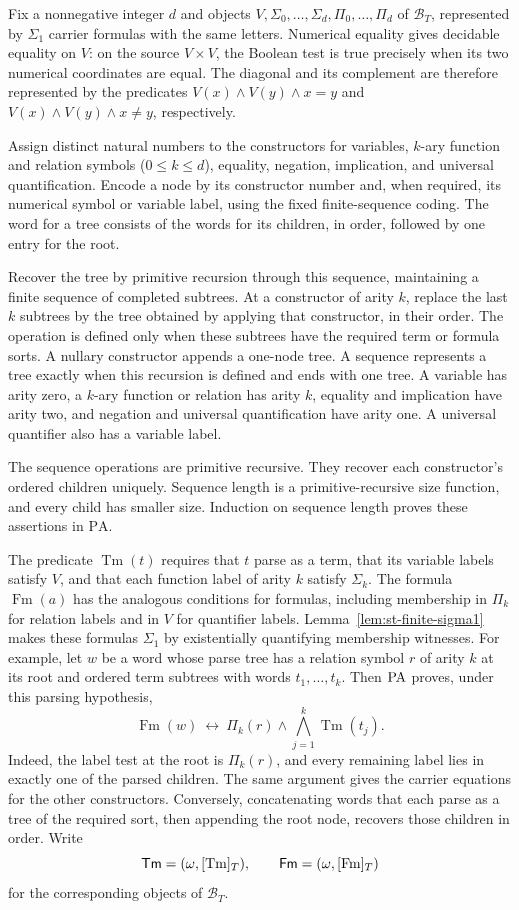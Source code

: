 Fix a nonnegative integer $d$ and objects
$V,\Sigma_0,\ldots,\Sigma_d,\Pi_0,\ldots,\Pi_d$
of $\mathcal B_T$, represented by $\Sigma_1$ carrier formulas with
the same letters. Numerical equality gives decidable equality on
$V$: on the source $V\times V$, the Boolean test is true precisely
when its two numerical coordinates are equal. The diagonal and its
complement are therefore represented by the predicates
$V(x)\land V(y)\land x=y$ and
$V(x)\land V(y)\land x\ne y$, respectively.

Assign distinct natural numbers to the constructors for variables,
$k$-ary function and relation symbols ($0\leq k\leq d$), equality,
negation, implication, and universal quantification.
Encode a node by its constructor number and, when required, its
numerical symbol or variable label, using the fixed finite-sequence
coding. The word for a tree consists of the words for its children, in order,
followed by one entry for the root.

Recover the tree by primitive recursion through this sequence,
maintaining a finite sequence of completed subtrees. At a constructor
of arity $k$, replace the last $k$ subtrees by the tree obtained by
applying that constructor, in their order. The operation is defined
only when these subtrees have the required term or formula sorts.
A nullary constructor appends a one-node tree. A sequence represents
a tree exactly when this recursion is defined and ends with one tree.
A variable has arity zero, a $k$-ary function or relation has arity $k$,
equality and implication have arity two, and negation and universal
quantification have arity one. A universal quantifier also has a
variable label.

The sequence operations are primitive recursive. They recover each
constructor's ordered children uniquely. Sequence length is a
primitive-recursive size function, and every child has smaller size.
Induction on sequence length proves these assertions in $\mathrm{PA}$.

The predicate $\operatorname{Tm}(t)$ requires that $t$ parse as a term,
that its variable labels satisfy $V$, and that each function label of
arity $k$ satisfy $\Sigma_k$. The formula
$\operatorname{Fm}(a)$ has the analogous conditions for formulas,
including membership in $\Pi_k$ for relation labels and in $V$ for
quantifier labels. Lemma~\ref{lem:st-finite-sigma1} makes these
formulas $\Sigma_1$ by existentially quantifying membership witnesses.
For example, let $w$ be a word whose parse tree has a relation
symbol $r$ of arity $k$ at its root and ordered term subtrees
with words $t_1,\ldots,t_k$. Then $\mathrm{PA}$ proves, under this
parsing hypothesis,
\[
  \operatorname{Fm}(w)\ \longleftrightarrow\
  \Pi_k(r)\land\bigwedge_{j=1}^k\operatorname{Tm}(t_j).
\]
Indeed, the label test at the root is $\Pi_k(r)$, and every
remaining label lies in exactly one of the parsed children.
The same argument gives the carrier equations for the other
constructors. Conversely, concatenating words that each parse
as a tree of the required sort, then appending the root node,
recovers those children in order.
Write
\[
 \mathsf{Tm}=(\omega,[\operatorname{Tm}]_T),\qquad
 \mathsf{Fm}=(\omega,[\operatorname{Fm}]_T)
\]
for the corresponding objects of $\mathcal B_T$.

